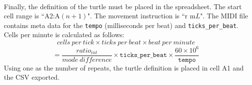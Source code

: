 \paragraph{} Finally, the definition of the turtle must be placed in the spreadsheet. The start cell range is ``A2:A$(n+1)$". The movement instruction is ``r m$L$". The MIDI file contains meta data for the \texttt{tempo} (milliseconds per beat) and \texttt{ticks\_per\_beat}. Cells per minute is calculated as follows:
  $$cells\ per\ tick \times ticks\ per\ beat \times beat\ per\ minute$$
  $$= \frac{ratio_{int}}{mode\ difference} \times \texttt{ticks\_per\_beat} \times \frac{60 \times 10^6}{\texttt{tempo}}$$
Using one as the number of repeats, the turtle definition is placed in cell A1 and the CSV exported.


